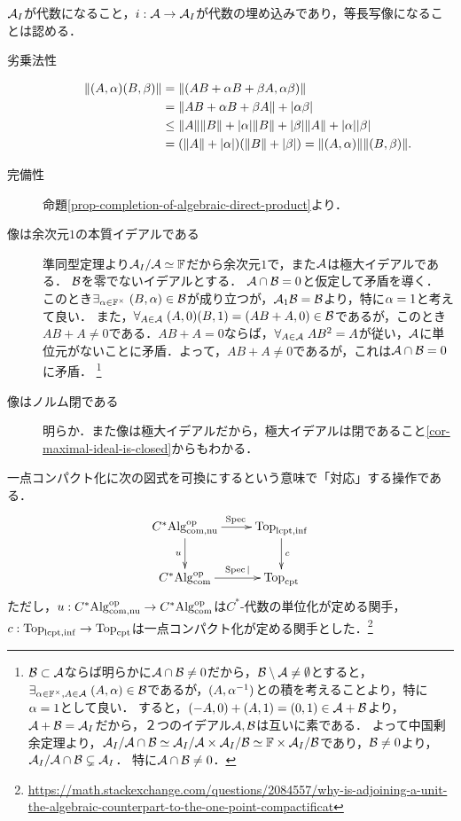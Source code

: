 \documentclass[uplatex,dvipdfmx]{jsreport}
\begin{document}
\begin{Proof}
    $\mathcal{A}_I$が代数になること，$i:\mathcal{A}\to\mathcal{A}_I$が代数の埋め込みであり，等長写像になることは認める．
    \begin{description}
        \item[劣乗法性] \begin{align*}
            \|(A,\alpha)(B,\beta)\|&=\|(AB+\alpha B+\beta A,\alpha\beta)\|\\
            &=\|AB+\alpha B+\beta A\|+\lvert\alpha\beta\rvert\\
            &\le\|A\|\|B\|+\lvert\alpha\rvert\|B\|+\lvert\beta\rvert\|A\|+\lvert\alpha\rvert\lvert\beta\rvert\\
            &=(\|A\|+\lvert\alpha\rvert)(\|B\|+\lvert\beta\rvert)=\|(A,\alpha)\|\|(B,\beta)\|.
        \end{align*}
        \item[完備性] 命題\ref{prop-completion-of-algebraic-direct-product}より．
        \item[像は余次元$1$の本質イデアルである] 準同型定理より$\mathcal{A}_I/\mathcal{A}\simeq\mathbb{F}$だから余次元$1$で，また$\mathcal{A}$は極大イデアルである．
        $\mathcal{B}$を零でないイデアルとする．
        $\mathcal{A}\cap\mathcal{B}=0$と仮定して矛盾を導く．
        このとき$\exists_{\alpha\in\mathbb{F}^\times}\;(B,\alpha)\in\mathcal{B}$が成り立つが，$\mathcal{A}_1\mathcal{B}=\mathcal{B}$より，特に$\alpha=1$と考えて良い．
        また，$\forall_{A\in\mathcal{A}}\;(A,0)(B,1)=(AB+A,0)\in\mathcal{B}$であるが，このとき$AB+A\ne0$である．$AB+A=0$ならば，$\forall_{A\in\mathcal{A}}\;AB^2=A$が従い，$\mathcal{A}$に単位元がないことに矛盾．よって，$AB+A\ne0$であるが，これは$\mathcal{A}\cap\mathcal{B}=0$に矛盾．
        \footnote{$\mathcal{B}\subset\mathcal{A}$ならば明らかに$\mathcal{A}\cap\mathcal{B}\ne0$だから，$\mathcal{B}\setminus\mathcal{A}\ne\emptyset$とすると，$\exists_{\alpha\in\mathbb{F}^\times,A\in\mathcal{A}}\;(A,\alpha)\in\mathcal{B}$であるが，$(A,\alpha^{-1})$との積を考えることより，特に$\alpha=1$として良い．
        すると，$(-A,0)+(A,1)=(0,1)\in \mathcal{A}+\mathcal{B}$より，$\mathcal{A}+\mathcal{B}=\mathcal{A}_I$だから，２つのイデアル$\mathcal{A},\mathcal{B}$は互いに素である．
        よって中国剰余定理より，$\mathcal{A}_I/\mathcal{A}\cap\mathcal{B}\simeq\mathcal{A}_I/\mathcal{A}\times\mathcal{A}_I/\mathcal{B}\simeq\mathbb{F}\times\mathcal{A}_I/\mathcal{B}$であり，$\mathcal{B}\ne0$より，$\mathcal{A}_I/\mathcal{A}\cap\mathcal{B}\subsetneq\mathcal{A}_I$．
        特に$\mathcal{A}\cap\mathcal{B}\ne0$．}
        \item[像はノルム閉である]
        明らか．また像は極大イデアルだから，極大イデアルは閉であること\ref{cor-maximal-ideal-is-closed}からもわかる．
    \end{description}
\end{Proof}
\begin{remarks}[一点コンパクト化との対応]
    一点コンパクト化に次の図式を可換にするという意味で「対応」する操作である．
    \[\xymatrix{
        C^*\Alg_{\com,\nonunital}^\op\ar[r]^-{\Spec}\ar[d]_-{u}&\Top_{\lcpt,\infinity}\ar[d]^-c\\
        C^*\Alg^\op_\com\ar[r]^-{\Spec|}&\Top_\cpt
    }\]
    ただし，$u:C^*\mathrm{Alg}^{\mathrm{op}}_{\mathrm{com},\mathrm{nu}}\to C^*\mathrm{Alg}^{\mathrm{op}}_{\mathrm{com}}$は$C^*$-代数の単位化が定める関手，$c:\mathrm{Top}_{\mathrm{lcpt},\mathrm{inf}}\to\mathrm{Top}_{\mathrm{cpt}}$は一点コンパクト化が定める関手とした．\footnote{\url{https://math.stackexchange.com/questions/2084557/why-is-adjoining-a-unit-the-algebraic-counterpart-to-the-one-point-compactificat}}
\end{remarks}
\end{document}
